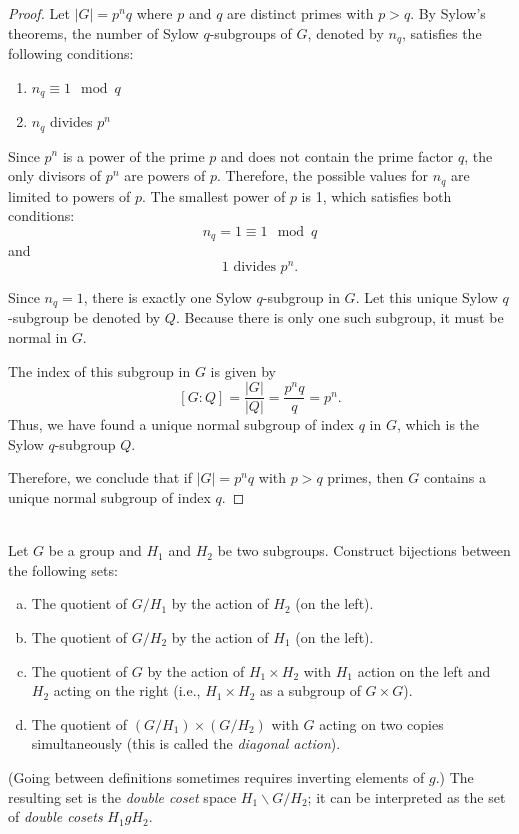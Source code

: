 \documentclass{article}
\begin{document}
\begin{proof}
    Let $|G| = p^n q$ where $p$ and $q$ are distinct primes with $p > q$. By Sylow's theorems, the number of Sylow $q$-subgroups of $G$, denoted by $n_q$, satisfies the following conditions:
    \begin{enumerate}
        \item $n_q \equiv 1 \mod q$
        \item $n_q$ divides $p^n$
    \end{enumerate}

    Since $p^n$ is a power of the prime $p$ and does not contain the prime factor $q$, the only divisors of $p^n$ are powers of $p$. Therefore, the possible values for $n_q$ are limited to powers of $p$. The smallest power of $p$ is 1, which satisfies both conditions:
    \[
        n_q = 1 \equiv 1 \mod q
    \]
    and
    \[
        1 \text{ divides } p^n.
    \]

    Since $n_q = 1$, there is exactly one Sylow $q$-subgroup in $G$. Let this unique Sylow $q$-subgroup be denoted by $Q$. Because there is only one such subgroup, it must be normal in $G$. 

    The index of this subgroup in $G$ is given by
    \[
        [G : Q] = \frac{|G|}{|Q|} = \frac{p^n q}{q} = p^n.
    \]
    Thus, we have found a unique normal subgroup of index $q$ in $G$, which is the Sylow $q$-subgroup $Q$. 

    Therefore, we conclude that if $|G| = p^n q$ with $p > q$ primes, then $G$ contains a unique normal subgroup of index $q$.
\end{proof}



\begin{problem} \\
    Let $G$ be a group and $H_1$ and $H_2$ be two subgroups. Construct bijections between the following sets:
    \begin{enumerate}[(a)]
        \item The quotient of $G/H_1$ by the action of $H_2$ (on the left).
        \item The quotient of $G/H_2$ by the action of $H_1$ (on the left).
        \item The quotient of $G$ by the action of $H_1 \times H_2$ with $H_1$ action on the left and $H_2$ acting on the right (i.e., $H_1 \times H_2$ as a subgroup of $G \times G$).
        \item The quotient of $(G/H_1) \times (G/H_2)$ with $G$ acting on two copies simultaneously (this is called the \textit{diagonal action}).
    \end{enumerate}
    (Going between definitions sometimes requires inverting elements of $g$.) The resulting set is the \textit{double coset} space $H_1 \backslash G / H_2$; it can be interpreted as the set of \textit{double cosets} $H_1 g H_2$. %
\end{problem}
\end{document}
